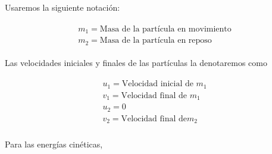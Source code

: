 \documentclass[a4paper,10pt]{article}
\begin{document}
\vspace{.3cm}

Usaremos la siguiente notación:

 \begin{gather}
 \begin{split}
% 
  m_1 = \text{Masa de la partícula en movimiento} \\
  m_2 = \text{Masa de la partícula en reposo}
%  
  \label{eq:masas}
%  
 \end{split}
 \end{gather}

Las velocidades iniciales y finales de las partículas la denotaremos como

 \begin{gather}
 \begin{split}
%   
% 
  u_1 = \text{Velocidad inicial de } m_1 \\
  v_1 = \text{Velocidad final de } m_1 \\
%   
  u_2 = 0 \\
  v_2 = \textrm{Velocidad final de} m_2\\
 \label{eq:velMasas}
 \end{split}
 \end{gather}

 
Para las energías cinéticas,
 
\end{document}
